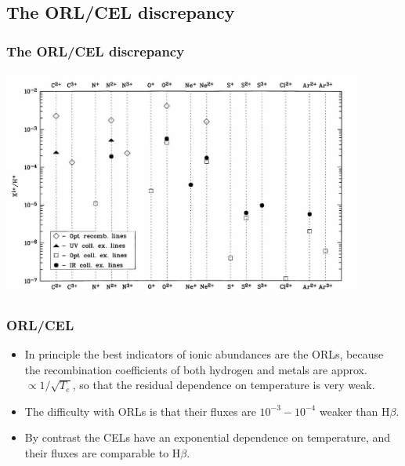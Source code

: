 \subsection{The ORL/CEL discrepancy}
\begin{frame}\frametitle{The ORL/CEL discrepancy }

\begin{center}
      \includegraphics[width=0.9\textwidth,height=!]{./C/ORL_CEL_general.jpg}
\end{center}


\end{frame}
\begin{frame}\frametitle{ORL/CEL}

\begin{itemize}
\item In principle the best indicators of ionic abundances are the
ORLs, because the recombination coefficients of both hydrogen and
metals are approx. $\propto 1/\sqrt{T_e}$, so that the residual
dependence on temperature is very weak.

\item The difficulty with  ORLs is that their fluxes are  $10^{-3} -
10^{-4}$ weaker than H$\beta$.

\item By contrast the CELs have an exponential dependence on
temperature, and their fluxes are comparable to H$\beta$.

\end{itemize}

\end{frame}
